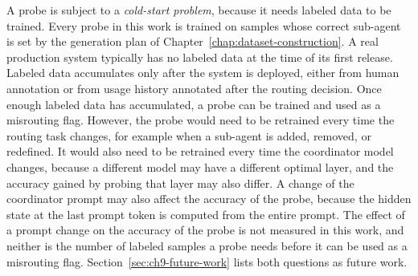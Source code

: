 A probe is subject to a \emph{cold-start problem}, because it needs labeled data to be trained. Every probe in this work is trained on samples whose correct sub-agent is set by the generation plan of Chapter~\ref{chap:dataset-construction}. A real production system typically has no labeled data at the time of its first release. Labeled data accumulates only after the system is deployed, either from human annotation or from usage history annotated after the routing decision. Once enough labeled data has accumulated, a probe can be trained and used as a misrouting flag. However, the probe would need to be retrained every time the routing task changes, for example when a sub-agent is added, removed, or redefined. It would also need to be retrained every time the coordinator model changes, because a different model may have a different optimal layer, and the accuracy gained by probing that layer may also differ. A change of the coordinator prompt may also affect the accuracy of the probe, because the hidden state at the last prompt token is computed from the entire prompt. The effect of a prompt change on the accuracy of the probe is not measured in this work, and neither is the number of labeled samples a probe needs before it can be used as a misrouting flag. Section~\ref{sec:ch9-future-work} lists both questions as future work.
